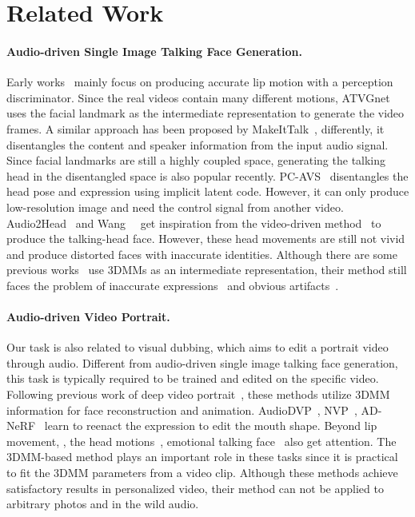 \section{Related Work}
\label{sec:related}

\paragraph{Audio-driven Single Image Talking Face Generation.} Early works~\cite{lipgan, wav2lip, videoretalking} mainly focus on producing accurate lip motion with a perception discriminator. Since the real videos contain many different motions, ATVGnet~\cite{atvgnet} uses the facial landmark as the intermediate representation to generate the video frames. A similar approach has been proposed by MakeItTalk~\cite{zhou2020makelttalk}, differently, it disentangles the content and speaker information from the input audio signal. 
Since facial landmarks are still a highly coupled space, generating the talking head in the disentangled space is also popular recently. PC-AVS~\cite{pcavs} disentangles the head pose and expression using implicit latent code. However, it can only produce low-resolution image and need the control signal from another video.
Audio2Head~\cite{wang2021audio2head} and Wang~\etal~\cite{wang2021one} get inspiration from the video-driven method~\cite{fomm} to produce the talking-head face. However, these head movements are still not vivid and produce distorted faces with inaccurate identities. Although there are some previous works~\cite{hdtf, ren2021pirenderer} use 3DMMs as an intermediate representation, their method still faces the problem of inaccurate expressions~\cite{ren2021pirenderer} and obvious artifacts~\cite{hdtf}.
 
\paragraph{Audio-driven Video Portrait.} Our task is also related to visual dubbing, which aims to edit a portrait video through audio. Different from audio-driven single image talking face generation, this task is typically required to be trained and edited on the specific video. Following previous work of deep video portrait~\cite{dvp}, these methods utilize 3DMM information for face reconstruction and animation. AudioDVP~\cite{audiodvp}, NVP~\cite{nvp}, AD-NeRF~\cite{adnerf} learn to reenact the expression to edit the mouth shape. Beyond lip movement, \ie, the head motions~\cite{facial, lsp}, emotional talking face~\cite{evp} also get attention. The 3DMM-based method plays an important role in these tasks since it is practical to fit the 3DMM parameters from a video clip. Although these methods achieve satisfactory results in personalized video, their method can not be applied to arbitrary photos and in the wild audio.


